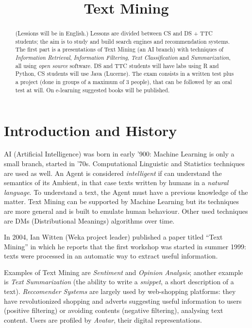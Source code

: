 \documentclass[11pt, a4page]{article}
\title{\textbf{Text Mining}}
\author{}
\date{}
\begin{document}
\maketitle
\begin{abstract}
  (Lessions will be in English.)
  Lessons are divided between CS and DS + TTC students; the aim is to study and build search engines and recommendation systems.
  The first part is a presentations of Text Mining (an AI branch) with techniques of \textit{Information Retrieval}, \textit{Information Filtering}, \textit{Text Classification} and \textit{Summarization}, all using \textit{open source} software.
  DS and TTC students will have labs using R and Python, CS students will use Java (Lucerne).
  The exam consists in a written test plus a project (done in groups of a maximum of 3 people), that can be followed by an oral test at will.
  On e-learning suggested books will be published.
\end{abstract}
\tableofcontents
\newpage

\section{Introduction and History}
AI (Artificial Intelligence) was born in early '900: Machine Learning is only a small branch, started in '70s.
Computational Linguistic and Statistics techniques are used as well.
An Agent is considered \textit{intelligent} if can understand the semantics of its Ambient, in that case texts written by humans in a \textit{natural language}.
To understand a text, the Agent must have a previous knowledge of the matter.
Text Mining can be supported by Machine Learning but its techniques are more general and is built to emulate human behaviour.
Other used techniques are DMs (Distributional Meanings) algorithms over time.

In 2004, Ian Witten (Weka project leader) published a paper titled ``Text Mining'' in which he reports that the first workshop was started in summer 1999: texts were processed in an automatic way to extract useful information.

Examples of Text Mining are \textit{Sentiment} and \textit{Opinion Analysis}; another example is \textit{Text Summarization} (the ability to write a \textit{snippet}, a short description of a text).
\textit{Reccomender Systems} are largely used by web-shopping platforms: they have revolutionized shopping and adverts suggesting useful information to users (positive filtering) or avoiding contents (negative filtering), analysing text content.
Users are profiled by \textit{Avatar}, their digital representations.
\end{document}
